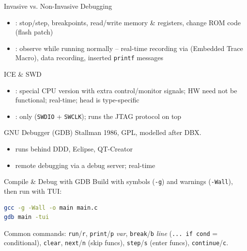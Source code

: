 
\begin{concept}{Invasive vs. Non-Invasive Debugging}
    \begin{itemize}
        \item {}: stop/step, breakpoints, read/write memory \&
              registers, change ROM code (flash patch)
        \item {}: observe while running normally --
              real-time recording via  (Embedded Trace Macro), data
              recording, inserted \texttt{printf} messages
    \end{itemize}
\end{concept}


\begin{definition}{ICE \& SWD}
    \begin{itemize}
        \item {}: special CPU version with extra
              control/monitor signals; HW need not be functional; real-time;
              head is type-specific
        \item {}: only 
              (\texttt{SWDIO} + \texttt{SWCLK}); runs the JTAG protocol on top
    \end{itemize}
\end{definition}

\begin{definition}{GNU Debugger (GDB)}
    Stallman 1986, GPL, modelled after DBX.
    \begin{itemize}
        \item runs behind DDD, Eclipse, QT-Creator
        \item remote debugging via a debug server;  real-time
    \end{itemize}
\end{definition}

\multend

\begin{KR}{Compile \& Debug with GDB}
    Build with symbols (\texttt{-g}) and warnings (\texttt{-Wall}), then run with TUI:
\begin{lstlisting}[language=bash, style=basesmol, aboveskip=2pt, belowskip=2pt]
gcc -g -Wall -o main main.c
gdb main -tui
\end{lstlisting}
    Common commands: \texttt{run}/\texttt{r}, \texttt{print}/\texttt{p} \emph{var},
    \texttt{break}/\texttt{b} \emph{line} (\texttt{... if cond} = conditional),
    \texttt{clear}, \texttt{next}/\texttt{n} (skip funcs), \texttt{step}/\texttt{s}
    (enter funcs), \texttt{continue}/\texttt{c}.
\end{KR}

